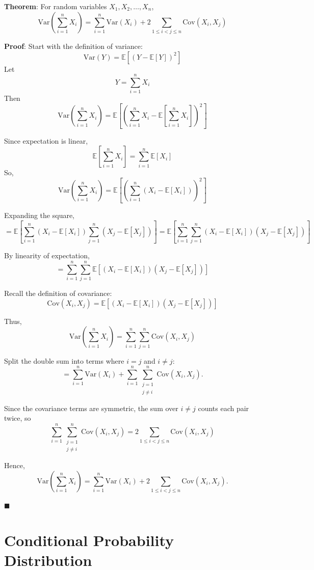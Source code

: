 \documentclass[twoside]{book}
\begin{document}
\begin{textbox}
\textbf{Theorem}: For random variables $X_1, X_2, \dots, X_n$,
$$\mathrm{Var}\left(\sum_{i=1}^n X_i\right) = \sum_{i=1}^n \mathrm{Var}(X_i) + 2 \sum_{1 \leq i < j \leq n} \mathrm{Cov}(X_i, X_j)$$
\end{textbox}

\textbf{Proof}: Start with the definition of variance:
\[
\mathrm{Var}(Y) = \mathbb{E}\left[(Y - \mathbb{E}[Y])^2\right]
\]
Let
\[
Y = \sum_{i=1}^n X_i
\]
Then
\[
\mathrm{Var}\left(\sum_{i=1}^n X_i\right) = \mathbb{E}\left[\left(\sum_{i=1}^n X_i - \mathbb{E}\left[\sum_{i=1}^n X_i\right]\right)^2\right]
\]

Since expectation is linear,
\[
\mathbb{E}\left[\sum_{i=1}^n X_i\right] = \sum_{i=1}^n \mathbb{E}[X_i]
\]
So,
\[
\mathrm{Var}\left(\sum_{i=1}^n X_i\right) = \mathbb{E}\left[\left(\sum_{i=1}^n (X_i - \mathbb{E}[X_i])\right)^2\right]
\]

Expanding the square,
\[
= \mathbb{E}\left[ \sum_{i=1}^n (X_i - \mathbb{E}[X_i]) \sum_{j=1}^n (X_j - \mathbb{E}[X_j]) \right]
= \mathbb{E}\left[ \sum_{i=1}^n \sum_{j=1}^n (X_i - \mathbb{E}[X_i])(X_j - \mathbb{E}[X_j]) \right]
\]

By linearity of expectation,
\[
= \sum_{i=1}^n \sum_{j=1}^n \mathbb{E}\left[(X_i - \mathbb{E}[X_i])(X_j - \mathbb{E}[X_j])\right]
\]

Recall the definition of covariance:
\[
\mathrm{Cov}(X_i, X_j) = \mathbb{E}[(X_i - \mathbb{E}[X_i])(X_j - \mathbb{E}[X_j])]
\]

Thus,
\[
\mathrm{Var}\left(\sum_{i=1}^n X_i\right) = \sum_{i=1}^n \sum_{j=1}^n \mathrm{Cov}(X_i, X_j)
\]

Split the double sum into terms where \( i = j \) and \( i \neq j \):
\[
= \sum_{i=1}^n \mathrm{Var}(X_i) + \sum_{i=1}^n \sum_{\substack{j=1 \\ j \neq i}}^n \mathrm{Cov}(X_i, X_j).
\]

Since the covariance terms are symmetric, the sum over \( i \neq j \) counts each pair twice, so
\[
\sum_{i=1}^n \sum_{\substack{j=1 \\ j \neq i}}^n \mathrm{Cov}(X_i, X_j) = 2 \sum_{1 \leq i < j \leq n} \mathrm{Cov}(X_i, X_j)
\]

Hence,
\[
\mathrm{Var}\left(\sum_{i=1}^n X_i\right) = \sum_{i=1}^n \mathrm{Var}(X_i) + 2 \sum_{1 \leq i < j \leq n} \mathrm{Cov}(X_i, X_j).
\]

\hfill $\blacksquare$

\section{Conditional Probability Distribution}
\end{document}
